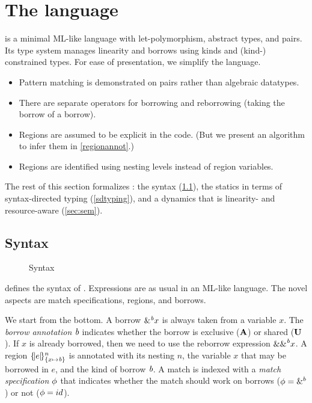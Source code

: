 \section{The \lang language}

\lang is a minimal ML-like language with
let-polymorphism, abstract types, and pairs. Its type system manages
linearity and borrows using kinds and (kind-) constrained types.
For ease of presentation, we simplify the language.
\begin{itemize}
\item Pattern matching is demonstrated on pairs rather than algebraic
  datatypes.
\item There are separate operators for borrowing and reborrowing (taking
  the borrow of a borrow).
\item Regions are assumed to be explicit in the code. (But we present
  an algorithm to infer them in \cref{regionannot}.)
\item Regions are identified using nesting levels instead of region
  variables.
\end{itemize}

The rest of this section formalizes  \lang: the syntax (\cref{syntax}),
the statics in terms of syntax-directed typing (\cref{sdtyping}),
and a dynamics that is linearity- and resource-aware (\cref{sec:sem}).

\subsection{Syntax}
\label{syntax}

\begin{figure}[!tb]
  
  \caption{Syntax}
  \label{grammar}
\end{figure}


 defines the syntax of \lang. Expressions are as usual
in an ML-like language.  The novel aspects are match
specifications, regions, and borrows.

We start from the bottom.
A borrow $\borrow{x}$ is always taken from a variable $x$. The
\emph{borrow annotation} $\BORROW$ indicates whether the borrow is exclusive
($\MBORROW$) or shared ($\IBORROW$). If $x$ is already borrowed,
then we need to use the reborrow expression $\reborrow{x}$.
%
A region $\region{\Sone x\BORROW}{e}$ is annotated with its nesting $n$, the variable $x$ that may be borrowed in $e$, and the kind of borrow $\BORROW$.
%
A match is indexed with a \emph{match specification} $\etransfm$ that indicates
whether the match should work on borrows ($\etransfm=\&^b$) or not ($\etransfm=id$).

